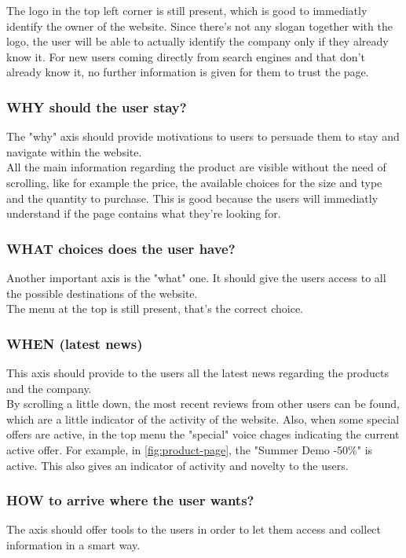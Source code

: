 The logo in the top left corner is still present, which is good to immediatly identify the owner of the website.
Since there's not any slogan together with the logo, the user will be able to actually identify the company only
if they already know it. For new users coming directly from search engines and that don't already know it, no
further information is given for them to trust the page.


\subsubsection{WHY should the user stay?} 
The "why" axis should provide motivations to users to persuade them to stay and navigate within the website.\\

All the main information regarding the product are visible without the need
of scrolling, like for example the price, the available choices for the size
and type and the quantity to purchase. This is good because the users will immediatly understand if 
the page contains what they're looking for.


\subsubsection{WHAT choices does the user have?} 
Another important axis is the "what" one. It should give the users access to all the possible destinations of the website.\\

The menu at the top is still present, that's the correct choice.

\subsubsection{WHEN (latest news)} 
This axis should provide to the users all the latest news regarding the products and the company.\\

By scrolling a little down, the most recent reviews from other users can be found, which are a little
indicator of the activity of the website. Also, when some special offers are active, in the top menu
the "special" voice chages indicating the current active offer. For example, in \cref{fig:product-page}, 
the "Summer Demo -50\%" is active. This also gives an indicator of activity and novelty to the users.

\subsubsection{HOW to arrive where the user wants?} 
The axis should offer tools to the users in order to let them access and collect information in a smart way.\\

